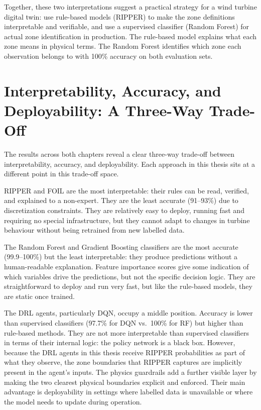 Together, these two interpretations suggest a practical strategy for a wind turbine
digital twin: use rule-based models (RIPPER) to make the zone definitions interpretable
and verifiable, and use a supervised classifier (Random Forest) for actual zone
identification in production. The rule-based model explains what each zone means in
physical terms. The Random Forest identifies which zone each observation belongs to with
100\% accuracy on both evaluation sets.

\section{Interpretability, Accuracy, and Deployability: A Three-Way Trade-Off}
\label{sec:ch5:tradeoff}

The results across both chapters reveal a clear three-way trade-off between
interpretability, accuracy, and deployability. Each approach in this thesis sits at a
different point in this trade-off space.

RIPPER and FOIL are the most interpretable: their rules can be read, verified, and
explained to a non-expert. They are the least accurate (91--93\%) due to discretization
constraints. They are relatively easy to deploy, running fast and requiring no special
infrastructure, but they cannot adapt to changes in turbine behaviour without being
retrained from new labelled data.

The Random Forest and Gradient Boosting classifiers are the most accurate (99.9--100\%)
but the least interpretable: they produce predictions without a human-readable
explanation. Feature importance scores give some indication of which variables drive the
predictions, but not the specific decision logic. They are straightforward to deploy and
run very fast, but like the rule-based models, they are static once trained.

The DRL agents, particularly DQN, occupy a middle position. Accuracy is lower than
supervised classifiers (97.7\% for DQN vs.\ 100\% for RF) but higher than rule-based
methods. They are not more interpretable than supervised classifiers in terms of their internal logic:
the policy network is a black box. However, because the DRL agents in this thesis
receive RIPPER probabilities as part of what they observe, the zone boundaries that
RIPPER captures are implicitly present in the agent's inputs. The physics guardrails
add a further visible layer by making the two clearest physical boundaries explicit
and enforced. Their main advantage is deployability in settings where labelled data
is unavailable or where the model needs to update during operation.


